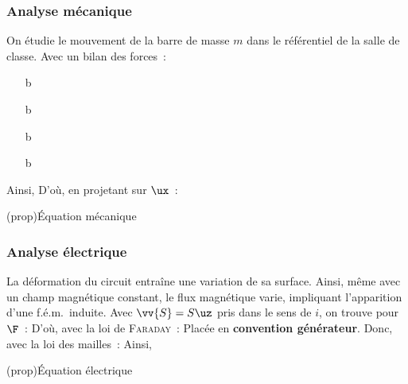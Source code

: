 \documentclass[../../main/main.tex]{subfiles}
\begin{document}
\subsubsection{Analyse mécanique}
\label{sssec:rlplmot_anameca}
On étudie le mouvement de la barre de masse $m$ dans le référentiel de la
salle de classe. Avec un bilan des forces~:
\begin{itemize}
	\item[b]{} %
	\item[b]{} %
	\item[b]{} %
	\item[b]{} %
\end{itemize}
Ainsi,
\psw{%
	\[
		m \dv{\vv{v}}{t} = \vv{P} + \vv{F\ind{Lap}} + \vv{N} + \vv{F_f}
	\]
}%
D'où, en projetant sur $\ux$~:
\begin{tcb}(prop){Équation mécanique}
\end{tcb}

\subsubsection{Analyse électrique}
\label{sssec:rlplmot_anaelec}
La déformation du circuit entraîne une variation de sa surface. Ainsi, même avec
un champ magnétique constant, le flux magnétique varie, impliquant l'apparition
d'une f.é.m.\ induite.
\bigbreak
\noindent
Avec $\vv{S} = S\uz$ pris dans le sens de $i$, on trouve pour $\F$~:
\psw{%
	\[
		\F = B\uz \cdot S\uz = BS = B \ell x
	\]
}%
D'où, avec la loi de \textsc{Faraday}~:
\psw{%
	\[
		e = -\dv{\F}{t} = -B \ell \dot{x}
	\]
}%
Placée en \textbf{convention générateur}. Donc, avec la loi des mailles~:
\psw{%
	\[
		e+U_0 = Ri \quad \Ra \quad U_0 = Ri + B \ell \dot{x}
	\]
}%
Ainsi,
\begin{tcb}(prop){Équation électrique}
\end{tcb}
\end{document}
